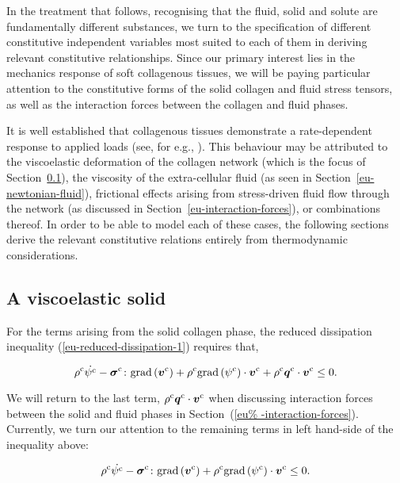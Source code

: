 In the treatment that follows, recognising that the fluid, solid and
solute are fundamentally different substances, we turn to the
specification of different constitutive independent variables most
suited to each of them in deriving relevant constitutive
relationships. Since our primary interest lies in the mechanics
response of soft collagenous tissues, we will be paying particular
attention to the constitutive forms of the solid collagen and fluid
stress tensors, as well as the interaction forces between the collagen
and fluid phases.

It is well established that collagenous tissues demonstrate a
rate-dependent response to applied loads (see, for e.g.,
\citet{Provenzanoetal:2001}). This behaviour may be attributed to the
viscoelastic deformation of the collagen network (which is the focus
of Section~\ref{eu-viscoelastic-solid}), the viscosity of the
extra-cellular fluid (as seen in Section~\ref{eu-newtonian-fluid}),
frictional effects arising from stress-driven fluid flow through the
network (as discussed in Section~\ref{eu-interaction-forces}), or
combinations thereof. In order to be able to model each of these
cases, the following sections derive the relevant constitutive
relations entirely from thermodynamic considerations.

\subsection{A viscoelastic solid}
\label{eu-viscoelastic-solid}

For the terms arising from the solid collagen phase, the reduced
dissipation inequality (\ref{eu-reduced-dissipation-1}) requires that,

\begin{equation*}
\rho^{\mathrm{c}} \dot{\psi^{\mathrm{c}}}
-\mbox{\boldmath$\sigma$}^{\mathrm{c}}\colon\mathrm{grad}\left(\mbox{\boldmath$ v$}^{\mathrm{c}}\right)+
\rho^{\mathrm{c}} \mathrm{grad}\left(\psi^{\mathrm{c}}\right)
\cdot\mbox{\boldmath$ v$}^{\mathrm{c}} +\rho^{\mathrm{c}}
\mbox{\boldmath$ q$}^{\mathrm{c}}\cdot\mbox{\boldmath$ v$}^{\mathrm{c}} \leq 0.
\end{equation*}

\noindent We will return to the last term, $\rho^{\mathrm{c}}
\mbox{\boldmath$ q$}^{\mathrm{c}}\cdot\mbox{\boldmath$ v$}^{\mathrm{c}}$ when discussing interaction
forces between the solid and fluid phases in Section~(\ref{eu%
  -interaction-forces}). Currently, we turn our attention to the
remaining terms in left hand-side of the inequality above:

\begin{equation}
\rho^{\mathrm{c}} \dot{\psi^{\mathrm{c}}}
-\mbox{\boldmath$\sigma$}^{\mathrm{c}}\colon\mathrm{grad} \left(\mbox{\boldmath$ v$}^{\mathrm{c}}\right)
+\rho^{\mathrm{c}} \mathrm{grad}\left(\psi^{\mathrm{c}}\right)
\cdot\mbox{\boldmath$ v$}^{\mathrm{c}} \leq 0.
\label{eu-reduced-dissipation-solid}
\end{equation}

